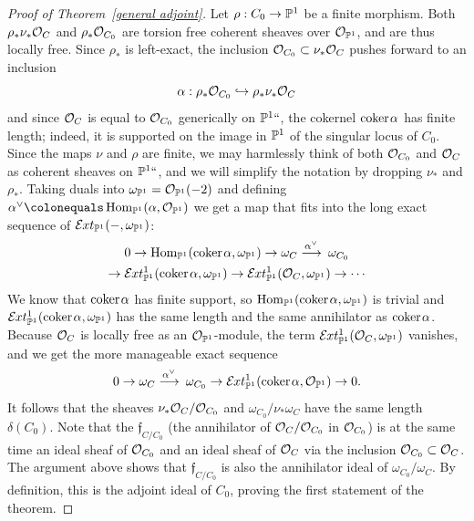 \begin{proof}[Proof of Theorem~\ref{general adjoint}]
Let
$\rho: C_0 \to {\mathbb P}^1$ be a finite morphism. Both $\rho_*\nu_*{\mathcal O}_C$
and $\rho_*{\mathcal O}_{C_0}$
are torsion free coherent sheaves over ${\mathcal O}_{{\mathbb P}^1}$, and are thus
locally free. Since $\rho_*$ is left-exact,
the inclusion ${\mathcal O}_{C_0} \subset \nu_*{\mathcal O}_C$ pushes forward to an
inclusion
$$
\alpha: \rho_*{\mathcal O}_{C_0} \hookrightarrow \rho_*\nu_*{\mathcal O}_C
$$
and since ${\mathcal O}_C$ is equal to ${\mathcal O}_{C_0}$ generically on ${\mathbb P}^1` `$, the
cokernel ${\rm{coker}\kern1pt} \alpha$ has finite length; indeed, it is supported on the
image in ${\mathbb P}^{1}$ of the singular locus of $C_0$. Since the maps $\nu$
and $\rho$ are finite, we may harmlessly think of both
${\mathcal O}_{C_0}$ and ${\mathcal O}_C$ as coherent sheaves on ${\mathbb P}^1` `$, and we will
simplify the notation by dropping $\nu_*$ and $\rho_*$.
Taking duals into $\omega_{{\mathbb P}^{1}} = {\mathcal O}_{{\mathbb P}^1}(-2)$ and defining
$\alpha^\vee \colonequals \Hom_{\PP^1}(\alpha, \sO_{\PP^1}) $ we get
a map that fits into the long exact sequence
of $\mathcal E\mkern-1mu xt_{{\mathbb P}^1}(-, \omega_{{\mathbb P}^{1}})$:
\begin{multline*}
0\to
\Hom_{\PP^1}(\coker \alpha,\omega_{\PP^{1}})
\to \omega_{C} \ruto {\alpha^\vee}\! \omega_{C_0}\\
\to
\sExt^1_{\PP^1}(\coker \alpha,\omega_{\PP^{1}})
\to
\sExt^1_{\PP^1}(\sO_C,\omega_{\PP^{1}})
\to
\cdots
\end{multline*}
We know that
${\rm{coker}\kern1pt} \alpha$ has finite support,
so
$\operatorname{Hom}_{{\mathbb P}^1}({\rm{coker}\kern1pt} \alpha,\omega_{{\mathbb P}^{1}})$
is trivial
and
$\mathcal E\mkern-1mu xt^1_{{\mathbb P}^1}({\rm{coker}\kern1pt} \alpha, \omega_{{\mathbb P}^{1}})$ has the same length
and the same annihilator
as ${\rm{coker}\kern1pt} \alpha$.
Because ${\mathcal O}_C$ is locally free as an
${\mathcal O}_{{\mathbb P}^1}$-module, the term
$\mathcal E\mkern-1mu xt^1_{{\mathbb P}^1}({\mathcal O}_C, \omega_{{\mathbb P}^{1}})$ vanishes, and we get the more
manageable exact sequence
$$
0\to \omega_{C} \ruto {\alpha^\vee}\! \omega_{C_0} \to
\sExt^1_{\PP^1}(\coker \alpha, \sO_{\PP^1}) \to 0.
$$
It follows that the sheaves $\nu_*{\mathcal O}_C/{\mathcal O}_{C_0}$ and
$\omega_{C_0}/\nu_*\omega_C$ have the same
length $\delta(C_0)$. Note that the
%
$\mathfrak f_{C/C_0}$
(the annihilator of ${\mathcal O}_C/{\mathcal O}_{C_0}$ in ${\mathcal O}_{C_0}$)
is at the same time an ideal sheaf of ${\mathcal O}_{C_0}$ and an
ideal sheaf of ${\mathcal O}_C$ via the inclusion ${\mathcal O}_{C_0}\subset {\mathcal O}_C$. The
argument above shows that $\mathfrak f_{C/C_0}$ is also the annihilator
ideal of $\omega_{C_0}/\omega_C$. By definition, this is the adjoint
ideal of $C_0$, proving the first statement
of the theorem.


\end{proof}

